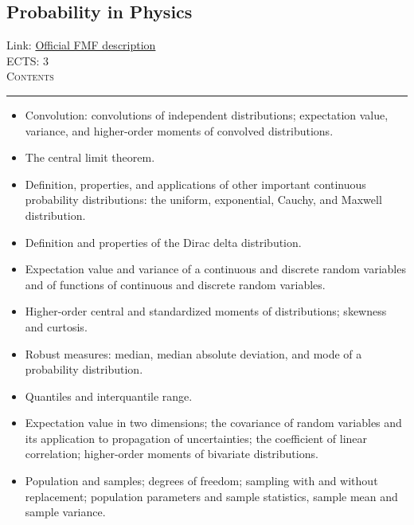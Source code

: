 \documentclass[11pt, a4paper]{article}
\newenvironment{course}[3]{
\subsection{#1}%
Link: \href{#2}{Official FMF description}\\%
ECTS: #3%
\vspace{1ex}
\\
{\large \textsc{Contents}}\\[-0.9ex]%
\rule{\textwidth}{0.5pt}
\vspace{-3ex}
}
{}
\newenvironment{chapter}[1]{
\begin{tcolorbox}[title=#1, breakable]
}
{\end{tcolorbox}}
\begin{document}
\begin{course}{Probability in Physics}{https://www.fmf.uni-lj.si/en/study-physics/programmes/1fiz/2020/7000777/courses/1177/}{3}
\begin{chapter}{Probability distributions}
\begin{itemize}
            \item Convolution: convolutions of independent distributions; expectation value, variance, and higher-order moments of convolved distributions.

            \item The central limit theorem.

            \item Definition, properties, and applications of other important continuous probability distributions: the uniform, exponential, Cauchy, and Maxwell distribution.

            \item Definition and properties of the Dirac delta distribution.

        \end{itemize}
    \end{chapter}

    \begin{chapter}{Quantifying distributions}
        \begin{itemize}
        
            \item Expectation value and variance of a continuous and discrete random variables and of functions of continuous and discrete random variables.

            \item Higher-order central and standardized moments of distributions; skewness and curtosis.

            \item Robust measures: median, median absolute deviation, and mode of a probability distribution.
            
            \item Quantiles and interquantile range.

            \item Expectation value in two dimensions; the covariance of random variables and its application to propagation of uncertainties; the coefficient of linear correlation; higher-order moments of bivariate distributions.

        \end{itemize}
    \end{chapter}

    \begin{chapter}{Introduction to statistics}
        \begin{itemize}
        
            \item Population and samples; degrees of freedom; sampling with and without replacement; population parameters and sample statistics, sample mean and sample variance.
            

\end{itemize}
\end{chapter}
\end{course}
\end{document}

